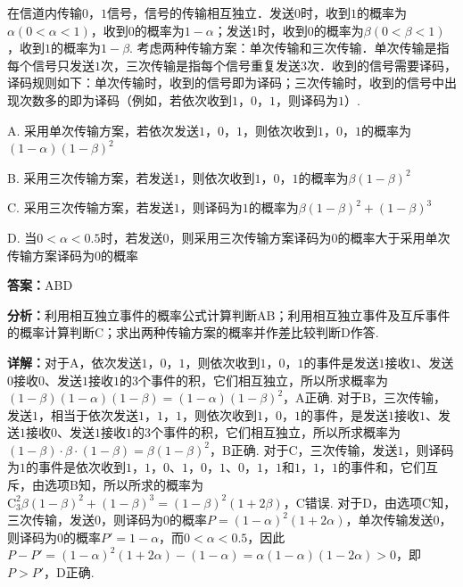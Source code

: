 \begin{question}[points=5]
在信道内传输$0$，$1$信号，信号的传输相互独立．发送$0$时，收到$1$的概率为$\alpha(0<\alpha<1)$，收到$0$的概率为$1-\alpha$；发送$1$时，收到$0$的概率为$\beta(0<\beta<1)$，收到$1$的概率为$1-\beta$. 考虑两种传输方案：单次传输和三次传输．单次传输是指每个信号只发送$1$次，三次传输是指每个信号重复发送$3$次．收到的信号需要译码，译码规则如下：单次传输时，收到的信号即为译码；三次传输时，收到的信号中出现次数多的即为译码（例如，若依次收到$1$，$0$，$1$，则译码为$1$）.
\begin{choices}
  \item A. 采用单次传输方案，若依次发送$1$，$0$，$1$，则依次收到$1$，$0$，$1$的概率为$(1-\alpha)(1-\beta)^{2}$
  \item B. 采用三次传输方案，若发送$1$，则依次收到$1$，$0$，$1$的概率为$\beta(1-\beta)^{2}$
  \item C. 采用三次传输方案，若发送$1$，则译码为$1$的概率为$\beta(1-\beta)^{2}+(1-\beta)^{3}$
  \item D. 当$0<\alpha<0.5$时，若发送$0$，则采用三次传输方案译码为$0$的概率大于采用单次传输方案译码为$0$的概率
\end{choices}
\begin{solution}
\textbf{答案：}ABD

\textbf{分析：}利用相互独立事件的概率公式计算判断AB；利用相互独立事件及互斥事件的概率计算判断C；求出两种传输方案的概率并作差比较判断D作答.

\textbf{详解：}对于A，依次发送$1$，$0$，$1$，则依次收到$1$，$0$，$1$的事件是发送$1$接收$1$、发送$0$接收$0$、发送$1$接收$1$的3个事件的积，它们相互独立，所以所求概率为$(1-\beta)(1-\alpha)(1-\beta)=(1-\alpha)(1-\beta)^{2}$，A正确.
对于B，三次传输，发送$1$，相当于依次发送$1$，$1$，$1$，则依次收到$1$，$0$，$1$的事件，是发送$1$接收$1$、发送$1$接收$0$、发送$1$接收$1$的3个事件的积，它们相互独立，所以所求概率为$(1-\beta)\cdot\beta\cdot(1-\beta)=\beta(1-\beta)^{2}$，B正确.
对于C，三次传输，发送$1$，则译码为$1$的事件是依次收到$1$，$1$，$0$、$1$，$0$，$1$、$0$，$1$，$1$和$1$，$1$，$1$的事件和，它们互斥，由选项B知，所以所求的概率为$\mathrm{C}_{3}^{2}\beta(1-\beta)^{2}+(1-\beta)^{3}=(1-\beta)^{2}(1+2\beta)$，C错误.
对于D，由选项C知，三次传输，发送$0$，则译码为$0$的概率$P=(1-\alpha)^{2}(1+2\alpha)$，单次传输发送$0$，则译码为$0$的概率$P'=1-\alpha$，而$0<\alpha<0.5$，因此$P-P'=(1-\alpha)^{2}(1+2\alpha)-(1-\alpha)=\alpha(1-\alpha)(1-2\alpha)>0$，即$P>P'$，D正确.
\end{solution}
\end{question}

